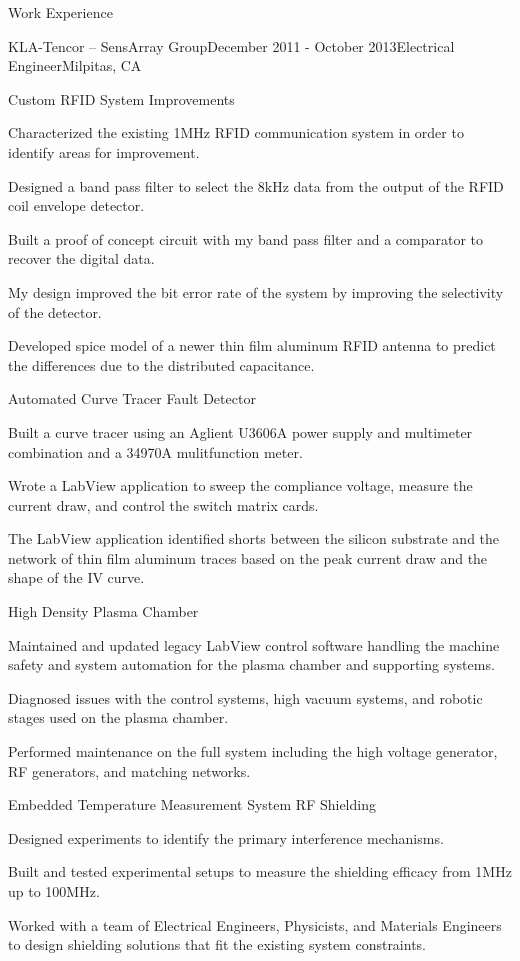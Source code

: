 \documentclass{resume} %
\begin{document}
\begin{rSection}{Work Experience}
\begin{rSubsection2}{KLA-Tencor -- SensArray Group}{December 2011 - October 2013}{Electrical Engineer}{Milpitas, CA}
\pagebreak[1]
\begin{rWorkProject}{Custom RFID System Improvements}
\item Characterized the existing 1MHz RFID communication system in order to identify areas for improvement.
\item Designed a band pass filter to select the 8kHz data from the output of the RFID coil envelope detector.
\item Built a proof of concept circuit with my band pass filter and a comparator to recover the digital data.
\item My design improved the bit error rate of the system by improving the selectivity of the detector.
\item Developed spice model of a newer thin film aluminum RFID antenna to predict the differences due to the distributed capacitance.
\end{rWorkProject}

\pagebreak[2]
\begin{rWorkProject}{Automated Curve Tracer Fault Detector}
\item Built a curve tracer using an Aglient U3606A power supply and multimeter combination and a 34970A mulitfunction meter.
\item Wrote a LabView application to sweep the compliance voltage, measure the current draw, and control the switch matrix cards.
\item The LabView application identified shorts between the silicon substrate and the network of thin film aluminum traces based on the peak current draw and the shape of the IV curve.
\end{rWorkProject}

\pagebreak[1]
\begin{rWorkProject}{High Density Plasma Chamber}
\item Maintained and updated legacy LabView control software handling the machine safety and system automation for the plasma chamber and supporting systems.
\item Diagnosed issues with the control systems, high vacuum systems, and robotic stages used on the plasma chamber.
\item Performed maintenance on the full system including the high voltage generator, RF generators, and matching networks.
\end{rWorkProject}

\pagebreak[1]
\begin{rWorkProject}{Embedded Temperature Measurement System RF Shielding}
\item Designed experiments to identify the primary interference mechanisms.
\item Built and tested experimental setups to measure the shielding efficacy from 1MHz up to 100MHz.
\item Worked with a team of Electrical Engineers, Physicists, and Materials Engineers to design shielding solutions that fit the existing system constraints.
\end{rWorkProject}


\end{rSubsection2}
\end{rSection}
\end{document}
